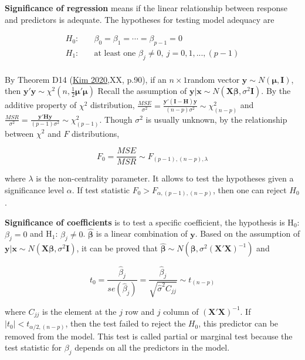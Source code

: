 \documentclass[
  11pt,
  openany]{memoir}
\begin{document}
\textbf{Significance of regression} means if the linear relationship between response and predictors is adequate. The hypotheses for testing model adequacy are

\begin{equation}
\begin{split}
H_0:&\quad \beta_0 = \beta_1 = \cdots =\beta_{p-1}=0\\
H_1:&\quad \text{at least one } \beta_j \neq 0,\ j=0,1,...,(p-1)\\
\end{split}
\label{eq:hyp-1}
\end{equation}

By Theorem D14 (\protect\hyperlink{ref-kimLectureNotes2020}{Kim 2020},XX, p.90), if an \(n\times1\)random vector \(\mathbf{y}\sim N(\boldsymbol{\mu},\mathbf{I})\), then
\(\mathbf{y'y} \sim \chi^2(n,\frac12\boldsymbol{\mu'\mu})\)
Recall the assumption of \(\mathbf{y|x}\sim N (\mathbf{X}\boldsymbol{\beta},\sigma^2\mathbf{I})\).
By the additive property of \(\chi^2\) distribution, \(\frac{MSE}{\sigma^2}=\frac{\mathbf{y'(I-H)y}}{(n-p)\sigma^2} \sim \chi^2_{(n-p)}\) and \(\frac{MSR}{\sigma^2}=\frac{\mathbf{y'Hy}}{(p-1)\sigma^2} \sim \chi^2_{(p-1)}\).
Though \(\sigma^2\) is usually unknown, by the relationship between \(\chi^2\) and \(F\) distributions,

\begin{equation}
F_0=\frac{MSE}{MSR} \sim F_{(p-1),(n-p),\lambda}
\end{equation}

where \(\lambda\) is the non-centrality parameter. It allows to test the hypotheses given a significance level \(\alpha\). If test statistic \(F_0>F_{\alpha,(p-1),(n-p)}\), then one can reject \(H_0\).

\textbf{Significance of coefficients} is to test a specific coefficient, the hypothesis is H\(_0\): \(\beta_j =0\) and H\(_1\): \(\beta_j \neq 0\).
\(\boldsymbol{\hat\beta}\) is a linear combination of \(\mathbf{y}\). Based on the assumption of \(\mathbf{y|x}\sim N (\mathbf{X}\boldsymbol{\beta},\sigma^2\mathbf{I})\), it can be proved that \(\boldsymbol{\hat\beta}\sim N (\boldsymbol{\beta},\sigma^2(\mathbf{X'X})^{-1})\) and

\begin{equation}
t_0=\frac{\hat\beta_j}{se(\hat\beta_j)}=\frac{\hat\beta_j}{\sqrt{\hat\sigma^2C_{jj}}} \sim t_{(n-p)}
\end{equation}

where \(C_{jj}\) is the element at the \(j\) row and \(j\) column of \((\mathbf{X'X})^{-1}\). If \(|t_0|< t_{\alpha/2,(n-p)}\), then the test failed to reject the \(H_0\), this predictor can be removed from the model. This test is called partial or marginal test because the test statistic for \(\beta_j\) depends on all the predictors in the model.
\end{document}
